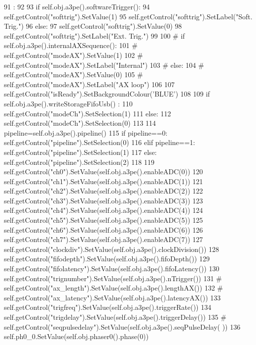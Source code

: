 \begin{DoxyCode}
91                     :
92 
93         if self.obj.a3pe().softwareTrigger():
94             self.getControl("softtrig").SetValue(1)
95             self.getControl("softtrig").SetLabel("Soft. Trig.")
96         else:
97             self.getControl("softtrig").SetValue(0)
98             self.getControl("softtrig").SetLabel("Ext. Trig.")
99 
100  #       if self.obj.a3pe().internalAXSequence():
101  #           self.getControl("modeAX").SetValue(1)
102  #           self.getControl("modeAX").SetLabel("Internal")
103  #       else:
104  #           self.getControl("modeAX").SetValue(0)
105  #           self.getControl("modeAX").SetLabel("AX loop")
106 
107         self.getControl("isReady").SetBackgroundColour('BLUE')
108 
109         if self.obj.a3pe().writeStorageFifoUsb() :
110             self.getControl("modeCh").SetSelection(1)
111         else:
112             self.getControl("modeCh").SetSelection(0)
113 
114         pipeline=self.obj.a3pe().pipeline()
115         if pipeline==0: self.getControl("pipeline").SetSelection(0)
116         elif pipeline==1: self.getControl("pipeline").SetSelection(1)
117         else: self.getControl("pipeline").SetSelection(2)
118 
119         self.getControl("ch0").SetValue(self.obj.a3pe().enableADC(0))
120         self.getControl("ch1").SetValue(self.obj.a3pe().enableADC(1))
121         self.getControl("ch2").SetValue(self.obj.a3pe().enableADC(2))
122         self.getControl("ch3").SetValue(self.obj.a3pe().enableADC(3))
123         self.getControl("ch4").SetValue(self.obj.a3pe().enableADC(4))
124         self.getControl("ch5").SetValue(self.obj.a3pe().enableADC(5))
125         self.getControl("ch6").SetValue(self.obj.a3pe().enableADC(6))
126         self.getControl("ch7").SetValue(self.obj.a3pe().enableADC(7))
127         self.getControl("clockdiv").SetValue(self.obj.a3pe().clockDivision())
128         self.getControl("fifodepth").SetValue(self.obj.a3pe().fifoDepth())
129         self.getControl("fifolatency").SetValue(self.obj.a3pe().fifoLatency())
130         self.getControl("trignumber").SetValue(self.obj.a3pe().nTrigger())
131 #        self.getControl("ax_length").SetValue(self.obj.a3pe().lengthAX())
132 #        self.getControl("ax_latency").SetValue(self.obj.a3pe().latencyAX())
133         self.getControl("trigfreq").SetValue(self.obj.a3pe().triggerRate())
134         self.getControl("trigdelay").SetValue(self.obj.a3pe().triggerDelay())
135 #        self.getControl("seqpulsedelay").SetValue(self.obj.a3pe().seqPulseDelay(
      ))
136         self.ph0_0.SetValue(self.obj.phaser0().phase(0))

\end{DoxyCode}
